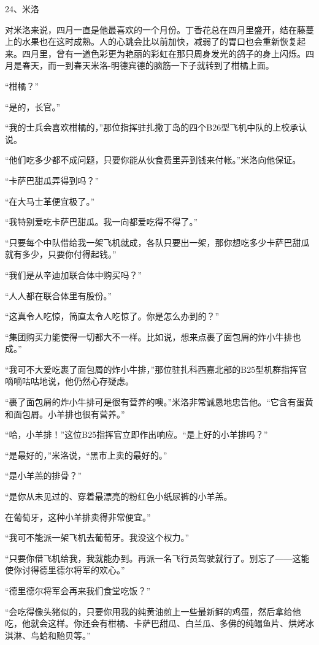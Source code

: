 24、米洛
 
    对米洛来说，四月一直是他最喜欢的一个月份。丁香花总在四月里盛开，结在藤蔓上的水果也在这时成熟。人的心跳会比以前加快，减弱了的胃口也会重新恢复起来。四月里，曾有一道色彩更为艳丽的彩虹在那只周身发光的鸽子的身上闪烁。四月是春天，而一到春天米洛-明德宾德的脑筋一下子就转到了柑橘上面。

    “柑橘？”

    “是的，长官。”

    “我的士兵会喜欢柑橘的，”那位指挥驻扎撒丁岛的四个B26型飞机中队的上校承认说。

    “他们吃多少都不成问题，只要你能从伙食费里弄到钱来付帐。”米洛向他保证。

    “卡萨巴甜瓜弄得到吗？”

    “在大马士革便宜极了。”

    “我特别爱吃卡萨巴甜瓜。我一向都爱吃得不得了。”

    “只要每个中队借给我一架飞机就成，各队只要出一架，那你想吃多少卡萨巴甜瓜就有多少，只要你付得起钱。”

    “我们是从辛迪加联合体中购买吗？”

    “人人都在联合体里有股份。”

    “这真令人吃惊，简直太令人吃惊了。你是怎么办到的？”

    “集团购买力能使得一切都大不一样。比如说，想来点裹了面包屑的炸小牛排也成。”

    “我可不大爱吃裹了面包屑的炸小牛排，”那位驻扎科西嘉北部的B25型机群指挥官嘀嘀咕咕地说，他仍然心存疑虑。

    “裹了面包屑的炸小牛排可是很有营养的噢。”米洛非常诚恳地忠告他。“它含有蛋黄和面包屑。小羊排也很有营养。”

    “哈，小羊排！”这位B25指挥官立即作出响应。“是上好的小羊排吗？”

    “是最好的，”米洛说，“黑市上卖的最好的。”

    “是小羊羔的排骨？”

    “是你从未见过的、穿着最漂亮的粉红色小纸尿裤的小羊羔。

    在葡萄牙，这种小羊排卖得非常便宜。”

    “我可不能派一架飞机去葡萄牙。我没这个权力。”

    “只要你借飞机给我，我就能办到。再派一名飞行员驾驶就行了。别忘了——这能使你讨得德里德尔将军的欢心。”

    “德里德尔将军会再来我们食堂吃饭？”

    “会吃得像头猪似的，只要你用我的纯黄油煎上一些最新鲜的鸡蛋，然后拿给他吃，他就会这样。你还会有柑橘、卡萨巴甜瓜、白兰瓜、多佛的纯鳎鱼片、烘烤冰淇淋、鸟蛤和贻贝等。”


